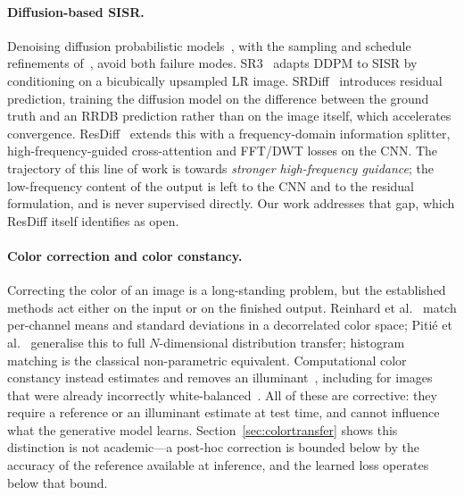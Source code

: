 \documentclass[11pt]{article}
\begin{document}
\paragraph{Diffusion-based SISR.}
Denoising diffusion probabilistic models~\cite{ho2020denoising}, with the
sampling and schedule refinements of~\cite{song2021ddim,nichol2021improved},
avoid both failure modes. SR3~\cite{saharia2022image} adapts DDPM to SISR by
conditioning on a bicubically upsampled LR image.
SRDiff~\cite{li2022srdiff} introduces residual prediction, training the diffusion
model on the difference between the ground truth and an RRDB prediction rather
than on the image itself, which accelerates convergence.
ResDiff~\cite{shang2024resdiff} extends this with a frequency-domain information
splitter, high-frequency-guided cross-attention and FFT/DWT losses on the CNN.
The trajectory of this line of work is towards \emph{stronger high-frequency
guidance}; the low-frequency content of the output is left to the CNN and to the
residual formulation, and is never supervised directly. Our work addresses that
gap, which ResDiff itself identifies as open.

\paragraph{Color correction and color constancy.}
Correcting the color of an image is a long-standing problem, but the established
methods act either on the input or on the finished output. Reinhard et
al.~\cite{reinhard2001color} match per-channel means and standard deviations in a
decorrelated color space; Piti\'e et al.~\cite{pitie2005ndim} generalise this to
full $N$-dimensional distribution transfer; histogram matching is the classical
non-parametric equivalent. Computational color constancy instead estimates and
removes an illuminant~\cite{barron2015convolutional}, including for images that
were already incorrectly white-balanced~\cite{afifi2019color}. All of these are
corrective: they require a reference or an illuminant estimate at test time, and
cannot influence what the generative model learns. Section~\ref{sec:colortransfer}
shows this distinction is not academic---a post-hoc correction is bounded below by
the accuracy of the reference available at inference, and the learned loss
operates below that bound.
\end{document}
